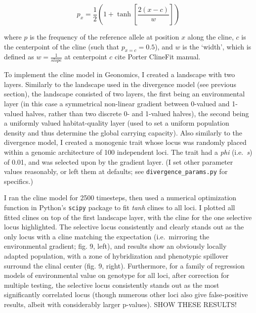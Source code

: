 ﻿\documentclass{article}
\begin{document}
\begin{equation}
p_{x} = \frac{1}{2}(1 + \tanh[\frac{2(x - c)}{w}])
\end{equation}

where $p$ is the frequency of the reference allele at position $x$ along the cline,
$c$ is the centerpoint of the cline (such that $p_{x=c} = 0.5$), and $w$ is the 
`width', which is defined as $w = \frac{1}{slope}$ at centerpoint
$c$ {\large cite Porter ClineFit manual}.

To implement the cline model in Geonomics, I created a landscape with two layers.
Similarly to the landscape used in the divergence model (see previous section), the
landscape consisted of two layers, the first being an environmental layer (in this case a
symmetrical non-linear gradient between 0-valued and 1-valued halves, rather than two
discrete 0- and 1-valued halves), the second being a uniformly valued
habitat-quality layer (used to set a uniform population density and thus determine
the global carrying capacity). Also similarly to the divergence model, I created a
monogenic trait whose locus was randomly placed within a genomic architecture of 
100 independent loci. The trait had a \emph{phi} (i.e.\ \emph{s}) of 0.01,
and was selected upon by the gradient layer.
(I set other parameter values reasonably, or left them
at defaults; see \texttt{divergence\_params.py} for specifics.)

I ran the cline model for 2500 timesteps, then used a numerical optimization
function in Python's \texttt{scipy} package to fit \emph{tanh} clines to all loci.
I plotted all fitted clines on top of the first landscape layer, with the cline
for the one selective locus highlighted.
The selective locus consistently and clearly stands out as the only locus with a cline
matching the expectation (i.e.\ mirroring the environmental gradient; fig. 9, left),
and results show an obviously locally adapted population, with a zone of hybridization
and phenotypic spillover surround the clinal center (fig. 9, right).
Furthermore, for a family of regression models of environmental value on genotype
for all loci, after correction for multiple testing, the selective locus consistently
stands out as the most significantly correlated locus (though numerous other loci
also give false-positive results, albeit with considerably larger p-values). SHOW
THESE RESULTS!
\end{document}
